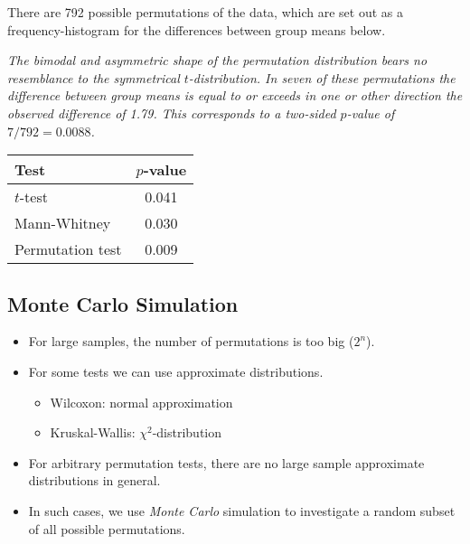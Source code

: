 \begin{solution}

There are 792 possible permutations of the data, which are set out as a frequency-histogram for the differences between group means below.


\bit
\it The bimodal and asymmetric shape of the permutation distribution bears no resemblance to the symmetrical $t$-distribution. 
\it In seven of these permutations the difference between group means is equal to or exceeds in one or other direction the observed difference of 1.79. 
\it This corresponds to a two-sided $p$-value of $7/792 = 0.0088$. 
\eit

\begin{minipage}{\linewidth}\centering
\begin{tabular}{lc}\hline
Test 				& $p$-value \\ \hline
$t$-test				& 0.041 \\
Mann-Whitney			& 0.030 \\
Permutation test		& 0.009 \\ \hline
\end{tabular}
\end{minipage}

\end{solution}


\subsection{Monte Carlo Simulation}
\begin{itemize}
\item
For large samples, the number of permutations is too big ($2^n$).
\item
For some tests we can use approximate distributions.
\begin{itemize}
\item Wilcoxon: normal approximation
\item Kruskal-Wallis: $\chi^2$-distribution
\end{itemize}
\item 
For arbitrary permutation tests, there are no large sample approximate distributions in general.
\item
In such cases, we use \emph{Monte Carlo} simulation to investigate a random subset of all possible permutations.
\end{itemize}

